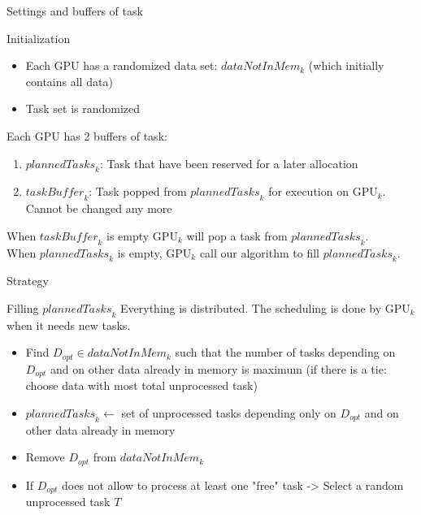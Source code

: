 \documentclass{libs/ufc_format}
\newcommand{\GPU}[1]{\ensuremath{\mathrm{GPU}_{#1}}\xspace}
\newcommand{\Dtouse}[1]{\ensuremath{\mathit{dataNotInMem}_{#1}}\xspace}
\newcommand{\plannedTasks}[1]{\ensuremath{\mathit{plannedTasks}_{#1}}\xspace}
\newcommand{\Dopt}{\ensuremath{D_{\mathit{opt}}}\xspace}
\newcommand{\Treturned}{\ensuremath{T}\xspace}
\newcommand{\pulledTasks}[1]{\ensuremath{\mathit{taskBuffer}_{#1}}\xspace}
\begin{document}
\begin{frame}{Settings and buffers of task}
	\begin{alertblock}{Initialization}
		\begin{itemize}
			\item Each GPU has a randomized data set: \Dtouse{k} (which initially contains all data)
			\item Task set is randomized
		\end{itemize}
	\end{alertblock}
	\begin{alertblock}{Each GPU has 2 buffers of  task:}
		\begin{enumerate}
			\item \plannedTasks{k}: Task that have been reserved for a later allocation
			\item \pulledTasks{k}: Task popped from \plannedTasks{k} for execution on \GPU{k}. Cannot be changed any more
		\end{enumerate}
		When \pulledTasks{k} is empty \GPU{k} will pop a task from \plannedTasks{k}.\\
		When \plannedTasks{k} is empty, \GPU{k} call our algorithm to fill \plannedTasks{k}.
	\end{alertblock}
\end{frame}

\begin{frame}{Strategy}
	\begin{alertblock}{Filling $\plannedTasks{k}$}
		Everything is distributed. The scheduling is done by \GPU{k} when it needs new tasks.
		\begin{itemize}
			\item Find $D_{opt}\in\Dtouse{k}$ such that the number of tasks depending on \Dopt and on other data already in memory is maximum
			(if there is a tie: choose data with most total unprocessed task)
			\item $\plannedTasks{k} \gets $ set of unprocessed tasks depending only on $\Dopt$ and on other data already in memory 
			\item Remove $\Dopt$ from \Dtouse{k}
			\item If \Dopt does not allow to process at least one "free" task  -> Select a random unprocessed task \Treturned
		\end{itemize}
	\end{alertblock}
\end{frame}
\end{document}

